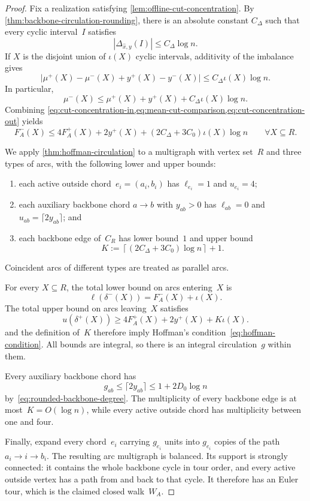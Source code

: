 \documentclass[12pt,a4paper,oneside]{report}
\begin{document}
\begin{proof}
Fix a realization satisfying
\cref{lem:offline-cut-concentration}.  By
\cref{thm:backbone-circulation-rounding}, there is an absolute constant
$C_\Delta$ such that every cyclic interval~$I$ satisfies
\[
    |\Delta_{\widehat x,y}(I)|
    \le C_\Delta\log n.
\]
If $X$ is the disjoint union of $\iota(X)$ cyclic intervals, additivity of the
imbalance gives
\[
    \bigl|
       \mu^+(X)-\mu^-(X)+y^+(X)-y^-(X)
    \bigr|
    \le C_\Delta\iota(X)\log n.
\]
In particular,
\begin{equation}\label{eq:mean-cut-comparison}
    \mu^-(X)
    \le\mu^+(X)+y^+(X)+C_\Delta\iota(X)\log n.
\end{equation}
Combining
\cref{eq:cut-concentration-in,eq:mean-cut-comparison,eq:cut-concentration-out}
yields
\begin{equation}\label{eq:realized-cut-comparison}
    F_A^-(X)
    \le
    4F_A^+(X)+2y^+(X)+
    (2C_\Delta+3C_0)\iota(X)\log n
    \qquad\forall X\subseteq R.
\end{equation}

We apply \cref{thm:hoffman-circulation} to a multigraph with vertex set~$R$
and three types of arcs, with the following lower and
upper bounds:
\begin{enumerate}
    \item each active outside chord~$e_i=(a_i,b_i)$ has
    $\ell_{e_i}=1$ and $u_{e_i}=4$;
    \item each auxiliary backbone chord $a\to b$ with $y_{ab}>0$ has
    $\ell_{ab}=0$ and $u_{ab}=\lceil2y_{ab}\rceil$; and
    \item each backbone edge of~$C_R$ has lower bound~$1$ and
    upper bound
    \[
        K:=
        \left\lceil
        (2C_\Delta+3C_0)\log n
        \right\rceil+1.
    \]
\end{enumerate}
Coincident arcs of different types are treated as parallel arcs.

For every $X\subseteq R$, the total lower bound on arcs entering~$X$ is
\[
    \ell(\delta^-(X))=F_A^-(X)+\iota(X).
\]
The total upper bound on arcs leaving~$X$ satisfies
\[
    u(\delta^+(X))
    \ge4F_A^+(X)+2y^+(X)+K\iota(X).
\]
 and the definition of~$K$
therefore imply Hoffman's condition~\cref{eq:hoffman-condition}.  All bounds
are integral, so there is an integral circulation~$g$ within them.

Every auxiliary backbone chord has
\[
    g_{ab}\le\lceil2y_{ab}\rceil
    \le 1+2D_0\log n
\]
by~\cref{eq:rounded-backbone-degree}.  The multiplicity of every backbone
edge is at most~$K=O(\log n)$, while every active outside chord has multiplicity
between one and four.

Finally, expand every chord~$e_i$ carrying $g_{e_i}$ units into
$g_{e_i}$ copies of the path $a_i\to i\to b_i$.  The resulting arc
multigraph is balanced.  Its support is strongly connected: it contains the
whole backbone cycle in tour order, and every active outside vertex has a path
from and back to that cycle.  It therefore has an Euler tour, which is the
claimed closed walk~$W_A$.
\end{proof}
\end{document}
